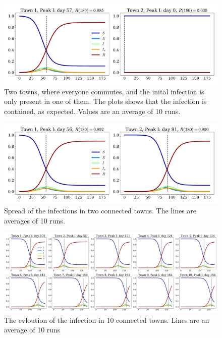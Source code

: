 \documentclass{article}
\begin{document}
    \begin{figure}[H]
        \centering
        \includegraphics[width=.7\textwidth]{../plots/2D/two_towns2.pdf}
        \caption{Two towns, where everyone commutes, and the inital infection is only present in one of them. The plots shows that the infection is contained, as expected. Values are an average of 10 runs.}
        \label{All commuters}
    \end{figure}

    \begin{figure}[H]
        \centering
        \includegraphics[width=.7\textwidth]{../plots/2D/two_towns.pdf}
        \caption{Spread of the infections in two connected towns. The lines are averages of 10 runs.}
        \label{two towns}
    \end{figure}

    \begin{figure}[H]
        \centering
        \includegraphics[width=\textwidth]{../plots/2D/nine_towns.pdf}
        \caption{The evloution of the infection in 10 connected towns. Lines are an average of 10 runs}
        \label{nine towns}
    \end{figure}
\end{document}
